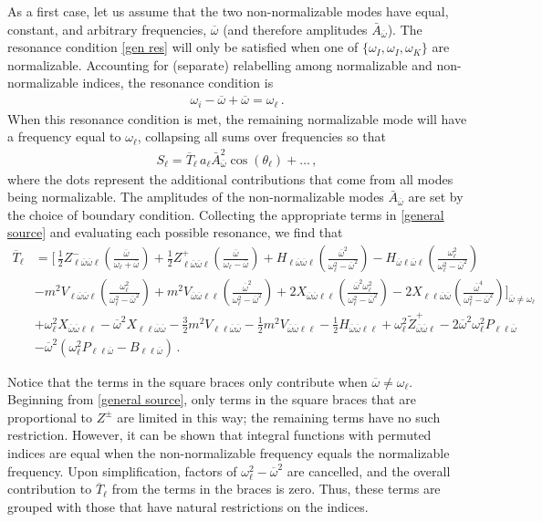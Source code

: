 \documentclass[letterpaper,11pt]{article}
\newcommand{\oi}{\omega_i}
\newcommand{\ol}{\omega_\ell}
\newcommand{\thl}{\theta_\ell}
\newcommand{\ob}{\overline{\omega}}
\begin{document}
As a first case, let us assume that the two non-normalizable modes have equal, constant, and arbitrary frequencies, $\ob$ (and therefore amplitudes $\bar A_{\ob}$). The resonance condition \eqref{gen res} will only be satisfied when one of $\{\omega_I, \omega_I, \omega_K \}$ are normalizable. Accounting for (separate) relabelling among normalizable and non-normalizable indices, the resonance condition is
\begin{align}
\label{gen nn}
\oi - \ob + \ob = \ol \, .
\end{align}
When this resonance condition is met, the remaining normalizable mode will have a frequency equal to $\ol$, collapsing all sums over frequencies so that
\begin{align}
\label{2genNN}
S_\ell = \overline{T}_{\ell} \, a_\ell \bar A_{\ob}^2 \cos (\thl) + \ldots \, ,
\end{align}
where the dots represent the additional contributions that come from all modes being normalizable. The amplitudes of the non-normalizable modes $\bar A_{\ob}$ are set by the choice of boundary condition. Collecting the appropriate terms in \eqref{general source} and evaluating each possible resonance, we find that
\begin{align}
\label{S:2NN}
\overline{T}_{\ell} &=  \bigg[ \, \frac{1}{2} Z^-_{\ell\ob\ob\ell} \left( \frac{\ob}{\ol + \ob} \right) + \frac{1}{2} Z^+_{\ell\ob\ob\ell} \left( \frac{\ob}{\ol - \ob} \right)  + H_{\ell \ob \ob \ell} \left( \frac{\ob^2}{\ol^2 - \ob^2} \right)  - H_{\ob\ell\ob\ell} \left(\frac{\ol^2}{\ol^2 - \ob^2} \right) \nonumber \\
%
& - m^2 V_{\ell \ob\ob\ell}  \left(\frac{\ol^2}{\ol^2 - \ob^2} \right) + m^2 V_{\ob\ob\ell\ell} \left( \frac{\ob^2}{\ol^2 - \ob^2} \right) + 2 X_{\ob\ob\ell\ell} \left( \frac{\ob^2 \ol^2}{\ol^2 - \ob^2} \right) - 2 X_{\ell\ell\ob\ob} \left( \frac{\ob^4}{\ol^2 - \ob^2} \right) \bigg]_{\ob \neq \ol} \nonumber \\
%
&  + \ol^2 X_{\ob\ob\ell\ell}  - \ob^2 X_{\ell\ell\ob\ob} - \frac{3}{2} m^2 V_{\ell\ell\ob\ob} - \frac{1}{2} m^2 V_{\ob\ob\ell\ell}  - \frac{1}{2} H_{\ob\ob\ell\ell} + \ol^2 \tilde{Z}^+_{\ob\ob\ell} - 2 \ob^2 \ol^2 P_{\ell\ell\ob} \nonumber \\
%
& - \ob^2 \left( \ol^2 P_{\ell\ell \ob} - B_{\ell\ell\ob} \right) \, .
\end{align}

Notice that the terms in the square braces only contribute when $\ob \neq \ol$. Beginning from \eqref{general source}, only terms in the square braces that are proportional to $Z^{\pm}$ are limited in this way; the remaining terms have no such restriction. However, it can be shown that integral functions with permuted indices are equal when the non-normalizable frequency equals the normalizable frequency. Upon simplification, factors of $\ol^2 - \ob^2$ are cancelled, and the overall contribution to $\overline{T}_\ell$ from the terms in the braces is zero. Thus, these terms are grouped with those that have natural restrictions on the indices. 
\end{document}
